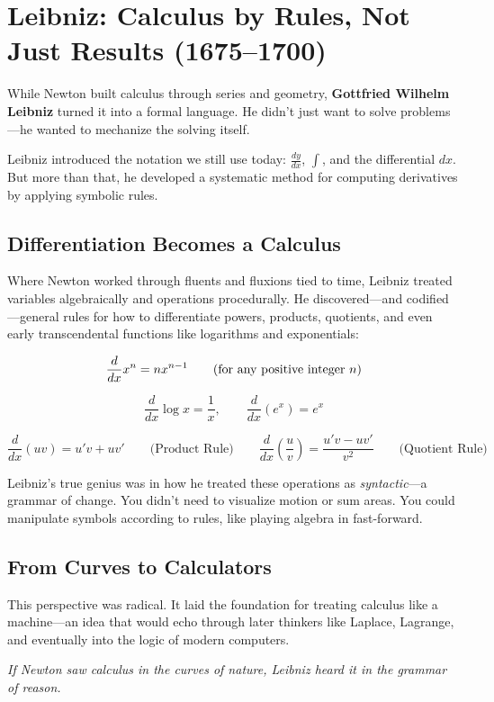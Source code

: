 \section{Leibniz: Calculus by Rules, Not Just Results (1675–1700)}

While Newton built calculus through series and geometry, \textbf{Gottfried Wilhelm Leibniz} turned it into a formal language.  
He didn’t just want to solve problems—he wanted to mechanize the solving itself.

Leibniz introduced the notation we still use today: \( \frac{dy}{dx} \), \( \int \), and the differential \( dx \).  
But more than that, he developed a systematic method for computing derivatives by applying symbolic rules.

\subsection{Differentiation Becomes a Calculus}

Where Newton worked through fluents and fluxions tied to time, Leibniz treated variables algebraically and operations procedurally.  
He discovered—and codified—general rules for how to differentiate powers, products, quotients, and even early transcendental functions like logarithms and exponentials:

\[
\frac{d}{dx} x^n = n x^{n-1} \qquad \text{(for any positive integer \( n \))}
\]

\[
\frac{d}{dx} \log x = \frac{1}{x}, \qquad \frac{d}{dx} (e^x) = e^x
\]

\[
\frac{d}{dx}(uv) = u'v + uv' \qquad \text{(Product Rule)}
\quad\quad
\frac{d}{dx} \left( \frac{u}{v} \right) = \frac{u'v - uv'}{v^2} \qquad \text{(Quotient Rule)}
\]

Leibniz’s true genius was in how he treated these operations as \textit{syntactic}—a grammar of change.  
You didn’t need to visualize motion or sum areas. You could manipulate symbols according to rules, like playing algebra in fast-forward.

\subsection{From Curves to Calculators}

This perspective was radical. It laid the foundation for treating calculus like a machine—an idea that would echo through later thinkers like Laplace, Lagrange, and eventually into the logic of modern computers.

\vspace{1em}

\begin{center}
\textit{If Newton saw calculus in the curves of nature, Leibniz heard it in the grammar of reason.}
\end{center}

